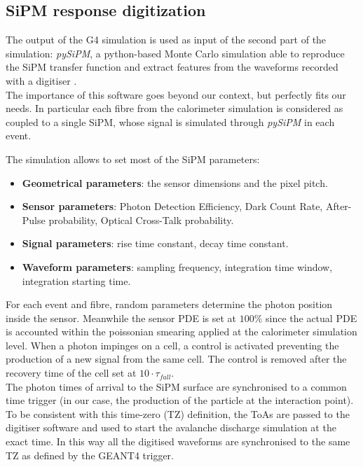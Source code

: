 \subsection{SiPM response digitization} \label{subsec:Sim_SiPM}
The output of the G4 simulation is used as input of the second part of the simulation: \textit{pySiPM}, a python-based Monte Carlo simulation able to reproduce the SiPM transfer function and extract features from the waveforms recorded with a digitiser \cite{digitizer}.\\

The importance of this software goes beyond our context, but perfectly fits our needs. In particular each fibre from the calorimeter simulation is considered as coupled to a single SiPM, whose signal is simulated through \textit{pySiPM} in each event.

The simulation allows to set most of the SiPM parameters:
\begin{itemize}
	\item \textbf{Geometrical parameters}: the sensor dimensions and the pixel pitch.
	\item \textbf{Sensor parameters}: Photon Detection Efficiency, Dark Count Rate, After-Pulse probability, Optical Cross-Talk probability.
	\item \textbf{Signal parameters}: rise time constant, decay time constant.
	\item \textbf{Waveform parameters}: sampling frequency, integration time window, integration starting time.
\end{itemize}

For each event and fibre, random parameters determine the photon position inside the sensor. %
Meanwhile the sensor PDE is set at $100\%$ since the actual PDE is accounted within the poissonian smearing applied at the calorimeter simulation level.
When a photon impinges on a cell, a control is activated preventing the production of a new signal from the same cell. The control is removed after the recovery time of the cell set at $10\cdot \tau_{fall}$.\\

The photon times of arrival to the SiPM surface are synchronised to a common time trigger (in our case, the production of the particle at the interaction point). To be consistent with this time-zero (TZ) definition, the ToAs are passed to the digitiser software and used to start the avalanche discharge simulation at the exact time. In this way all the digitised waveforms are synchronised to the same TZ as defined by the GEANT4 trigger.\\

